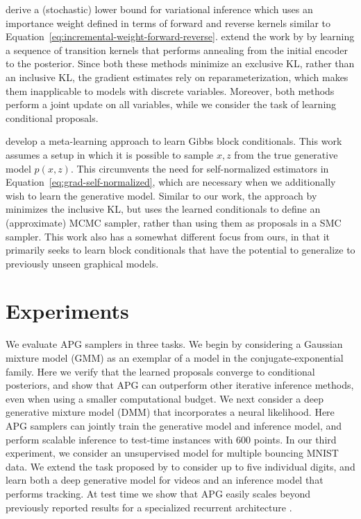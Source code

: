 \documentclass{article}
\theoremstyle{definition}
\begin{document}
\citet{salimans2015markov} derive a (stochastic) lower bound for variational inference which uses an importance weight defined in terms of forward and reverse kernels similar to Equation~\ref{eq:incremental-weight-forward-reverse}.
\citet{huang2018improving} extend the work by \citet{salimans2015markov} by learning a sequence of transition kernels that performs annealing from the initial encoder to the posterior. 
Since both these methods minimize an exclusive KL, rather than an inclusive KL, the gradient estimates rely on reparameterization, which makes them inapplicable to models with discrete variables. 
Moreover, both methods perform a joint update on all variables, while we consider the task of learning conditional proposals.

\citet{wang2018meta} develop a meta-learning approach to learn Gibbs block conditionals. This work assumes a setup in which it is possible to sample $x, z$ from the true generative model $p(x,z)$. This circumvents the need for self-normalized estimators in Equation~\ref{eq:grad-self-normalized}, which are necessary when we additionally wish to learn the generative model. Similar to our work, the approach by \citet{wang2018meta} minimizes the inclusive KL, but uses the learned conditionals to define an (approximate) MCMC sampler, rather than using them as proposals in a SMC sampler. This work also has a somewhat different focus from ours, in that it primarily seeks to learn block conditionals that have the potential to generalize to previously unseen graphical models.


\vspace{-0.25em}
\section{Experiments}
\label{sec:experiments}

We evaluate APG samplers in three tasks. We begin by considering a Gaussian mixture model (GMM) as an exemplar of a model in the conjugate-exponential family. Here we verify that the learned proposals converge to conditional posteriors, and show that APG can outperform other iterative inference methods, even when using a smaller computational budget. We next consider a deep generative mixture model (DMM) that incorporates a neural likelihood. Here APG samplers can jointly train the generative model and inference model, and perform scalable inference to test-time instances with 600 points. 
In our third experiment, we consider an unsupervised model for multiple bouncing MNIST data. We extend the task proposed by \citet{srivastava2015unsupervised} to consider up to five individual digits, and learn both a deep generative model for videos and an inference model that performs tracking. At test time we show that APG easily scales beyond previously reported results for a specialized recurrent architecture \cite{kosiorek2018sequential}. 
\end{document}
